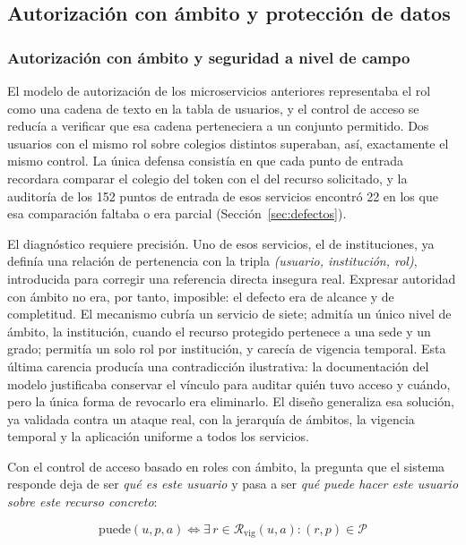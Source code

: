 \subsection{Autorización con ámbito y protección de datos}
\subsubsection{Autorización con ámbito y seguridad a nivel de campo}
\label{anx:autorizacion-datos}

El modelo de autorización de los microservicios anteriores representaba el rol como una
cadena de texto en la tabla de usuarios, y el control de acceso se reducía a verificar que
esa cadena perteneciera a un conjunto permitido. Dos usuarios con el mismo rol sobre
colegios distintos superaban, así, exactamente el mismo control. La única defensa consistía
en que cada punto de entrada recordara comparar el colegio del token con el del recurso
solicitado, y la auditoría de los 152 puntos de entrada de esos servicios encontró 22 en los
que esa comparación faltaba o era parcial (Sección~\ref{sec:defectos}).

El diagnóstico requiere precisión. Uno de esos servicios, el de instituciones, ya definía
una relación de pertenencia con la tripla \emph{(usuario, institución, rol)}, introducida
para corregir una referencia directa insegura real. Expresar autoridad con ámbito no era,
por tanto, imposible: el defecto era de alcance y de completitud. El mecanismo cubría un
servicio de siete; admitía un único nivel de ámbito, la institución, cuando el recurso
protegido pertenece a una sede y un grado; permitía un solo rol por institución, y carecía
de vigencia temporal. Esta última carencia producía una contradicción ilustrativa: la
documentación del modelo justificaba conservar el vínculo para auditar quién tuvo acceso y
cuándo, pero la única forma de revocarlo era eliminarlo. El diseño generaliza esa solución,
ya validada contra un ataque real, con la jerarquía de ámbitos, la vigencia temporal y la
aplicación uniforme a todos los servicios.

Con el control de acceso basado en roles con ámbito, la pregunta que el sistema responde
deja de ser \emph{qué es este usuario} y pasa a ser \emph{qué puede hacer este usuario sobre
este recurso concreto}:

\begin{equation}
\mathrm{puede}(u, p, a) \iff \exists\, r \in \mathcal{R}_{\text{vig}}(u, a) : (r, p) \in \mathcal{P}
\end{equation}


